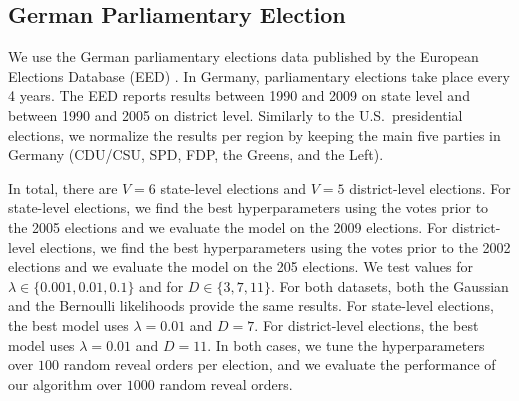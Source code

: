 \subsection{German Parliamentary Election}%
\label{app:ge}

We use the German parliamentary elections data published by the European Elections Database (EED) \cite{norsk2020germany}.
In Germany, parliamentary elections take place every 4 years.
The EED reports results between 1990 and 2009 on state level and between 1990 and 2005 on district level.
Similarly to the U.S.\ presidential elections, we normalize the results per region by keeping the main five parties in Germany (CDU/CSU, SPD, FDP, the Greens, and the Left).

In total, there are $V=6$ state-level elections and $V=5$ district-level elections.
For state-level elections, we find the best hyperparameters using the votes prior to the 2005 elections and we evaluate the model on the 2009 elections.
For district-level elections, we find the best hyperparameters using the votes prior to the 2002 elections and we evaluate the model on the 205 elections.
We test values for $\lambda \in \{0.001, 0.01, 0.1 \}$ and for $D \in \{3, 7, 11\}$.
For both datasets, both the Gaussian and the Bernoulli likelihoods provide the same results.
For state-level elections, the best model uses $\lambda=0.01$ and $D=7$.
For district-level elections, the best model uses $\lambda=0.01$ and $D=11$.
In both cases, we tune the hyperparameters over $100$ random reveal orders per election, and we evaluate the performance of our algorithm over $1000$ random reveal orders.
